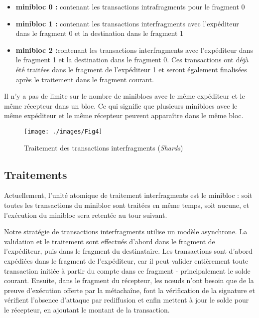 \documentclass[journal]{IEEEtran}
\begin{document}
\begin{itemize}
  \item \textbf{minibloc 0 :} contenant les transactions intrafragments pour le fragment 0
  \item \textbf{minibloc 1 :} contenant les transactions interfragments avec l'expéditeur dans le fragment 0 et la destination dans le fragment 1
  \item \textbf{minibloc 2 :}contenant les transactions interfragments avec l'expéditeur dans le fragment 1 et la destination dans le fragment 0. Ces transactions ont déjà été traitées dans le fragment de l'expéditeur 1 et seront également finalisées après le traitement dans le fragment courant.
\end{itemize}

Il n'y a pas de limite sur le nombre de miniblocs avec le même expéditeur et le même récepteur dans un bloc. Ce qui signifie que plusieurs miniblocs avec le même expéditeur et le même récepteur peuvent apparaître dans le même bloc.

\begin{figure*}[h]
         \centering
	\texttt{[image: ./images/Fig4]} %
	\caption{Traitement des transactions interfragments (\textit{Shards})} %
	\label{Fig.4} %
\end{figure*}

\subsection{Traitements}
Actuellement, l'unité atomique de traitement interfragments est le minibloc : soit toutes les transactions du minibloc sont traitées en même temps, soit aucune, et l'exécution du minibloc sera retentée au tour suivant.

Notre stratégie de transactions interfragments utilise un modèle asynchrone. La validation et le traitement sont effectués d'abord dans le fragment de l'expéditeur, puis dans le fragment du destinataire. Les transactions sont d'abord expédiées dans le fragment de l'expéditeur, car il peut valider entièrement toute transaction initiée à partir du compte dans ce fragment - principalement le solde courant. Ensuite, dans le fragment du récepteur, les nœuds n'ont besoin que de la preuve d'exécution offerte par la métachaîne, font la vérification de la signature et vérifient l'absence d'attaque par rediffusion et enfin mettent à jour le solde pour le récepteur, en ajoutant le montant de la transaction.
\end{document}
